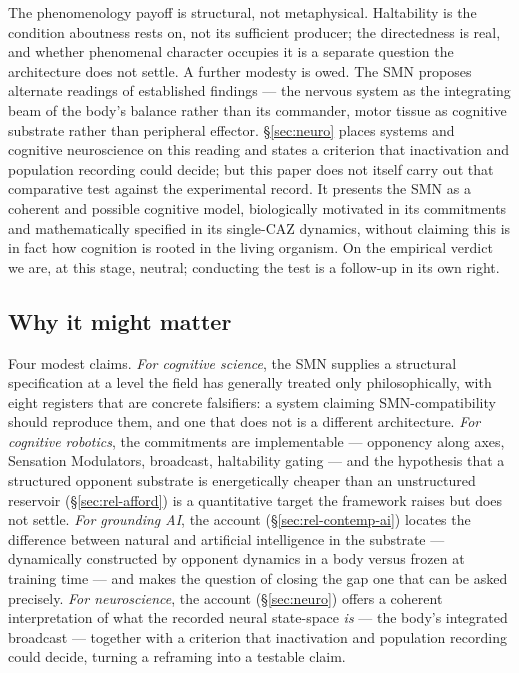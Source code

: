 \documentclass{article}
\begin{document}
The phenomenology payoff is structural, not metaphysical.  Haltability is
the condition aboutness rests on, not its sufficient producer; the
directedness is real, and whether phenomenal character occupies it is a
separate question the architecture does not settle.  A further modesty is
owed.  The SMN proposes alternate readings of established findings --- the
nervous system as the integrating beam of the body's balance rather than
its commander, motor tissue as cognitive substrate rather than peripheral
effector.  \S\ref{sec:neuro} places systems and cognitive neuroscience on
this reading and states a criterion that inactivation and population
recording could decide; but this paper does not itself carry out that
comparative test against the experimental record.  It presents the
SMN as a coherent and possible cognitive model, biologically motivated in
its commitments and mathematically specified in its single-CAZ dynamics,
without claiming this is in fact how cognition is rooted in the living
organism.  On the empirical verdict we are, at this stage, neutral;
conducting the test is a follow-up in its own right.

\subsection*{Why it might matter}

Four modest claims.  \emph{For cognitive science}, the SMN supplies a
structural specification at a level the field has generally treated only
philosophically, with eight registers that are concrete falsifiers: a
system claiming SMN-compatibility should reproduce them, and one that
does not is a different architecture.  \emph{For cognitive robotics}, the
commitments are implementable --- opponency along axes, Sensation
Modulators, broadcast, haltability gating --- and the hypothesis that a
structured opponent substrate is energetically cheaper than an
unstructured reservoir (\S\ref{sec:rel-afford}) is a quantitative target
the framework raises but does not settle.  \emph{For grounding AI}, the
account (\S\ref{sec:rel-contemp-ai}) locates the difference between
natural and artificial intelligence in the substrate --- dynamically
constructed by opponent dynamics in a body versus frozen at training time
--- and makes the question of closing the gap one that can be asked
precisely.  \emph{For neuroscience}, the account (\S\ref{sec:neuro}) offers
a coherent interpretation of what the recorded neural state-space
\emph{is} --- the body's integrated broadcast --- together with a
criterion that inactivation and population recording could decide, turning
a reframing into a testable claim.
\end{document}
